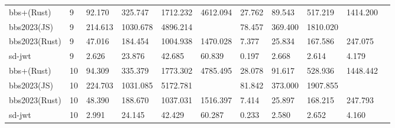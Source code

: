 \begin{table}[t]
\begin{tabular}{lllllllllll}
bbs+(Rust) & 9 & 92.170 & 325.747 & 1712.232 & 4612.094 & 27.762 & 89.543 & 517.219 & 1414.200 \\
bbs2023(JS) & 9 & 214.613 & 1030.678 & 4896.214 &  & 78.457 & 369.400 & 1810.020 &  \\
bbs2023(Rust) & 9 & 47.016 & 184.454 & 1004.938 & 1470.028 & 7.377 & 25.834 & 167.586 & 247.075 \\
sd-jwt & 9 & 2.626 & 23.876 & 42.685 & 60.839 & 0.197 & 2.668 & 2.614 & 4.179 \\
bbs+(Rust) & 10 & 94.309 & 335.379 & 1773.302 & 4785.495 & 28.078 & 91.617 & 528.936 & 1448.442 \\
bbs2023(JS) & 10 & 224.703 & 1031.085 & 5172.781 &  & 81.842 & 373.000 & 1907.855 &  \\
bbs2023(Rust) & 10 & 48.390 & 188.670 & 1037.031 & 1516.397 & 7.414 & 25.897 & 168.215 & 247.793 \\
sd-jwt & 10 & 2.991 & 24.145 & 42.429 & 60.287 & 0.233 & 2.580 & 2.652 & 4.160 \\
\bottomrule
\end{tabular}
\end{table}
